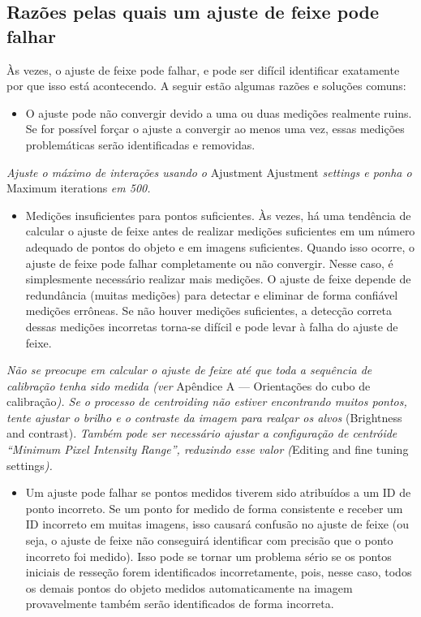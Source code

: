 \documentclass[
  12pt,
  letterpaper,
  DIV=11,
  numbers=noendperiod]{scrreprt}
\providecommand{\tightlist}{%
  \setlength{\itemsep}{0pt}\setlength{\parskip}{0pt}}
\begin{document}
\subsection{Razões pelas quais um ajuste de feixe pode
falhar}\label{razuxf5es-pelas-quais-um-ajuste-de-feixe-pode-falhar-1}

Às vezes, o ajuste de feixe pode falhar, e pode ser difícil identificar
exatamente por que isso está acontecendo. A seguir estão algumas razões
e soluções comuns:

\begin{itemize}
\tightlist
\item
  O ajuste pode não convergir devido a uma ou duas medições realmente
  ruins. Se for possível forçar o ajuste a convergir ao menos uma vez,
  essas medições problemáticas serão identificadas e removidas.
\end{itemize}

\emph{Ajuste o máximo de interações usando o} Ajustment \textbar{}
Ajustment \emph{settings e ponha o} Maximum iterations \emph{em 500.}

\begin{itemize}
\tightlist
\item
  Medições insuficientes para pontos suficientes. Às vezes, há uma
  tendência de calcular o ajuste de feixe antes de realizar medições
  suficientes em um número adequado de pontos do objeto e em imagens
  suficientes. Quando isso ocorre, o ajuste de feixe pode falhar
  completamente ou não convergir. Nesse caso, é simplesmente necessário
  realizar mais medições. O ajuste de feixe depende de redundância
  (muitas medições) para detectar e eliminar de forma confiável medições
  errôneas. Se não houver medições suficientes, a detecção correta
  dessas medições incorretas torna-se difícil e pode levar à falha do
  ajuste de feixe.
\end{itemize}

\emph{Não se preocupe em calcular o ajuste de feixe até que toda a
sequência de calibração tenha sido medida (ver} Apêndice A ---
Orientações do cubo de calibração\emph{). Se o processo de centroiding
não estiver encontrando muitos pontos, tente ajustar o brilho e o
contraste da imagem para realçar os alvos} (Brightness and contrast).
\emph{Também pode ser necessário ajustar a configuração de centróide
``Minimum Pixel Intensity Range'', reduzindo esse valor (}Editing and
fine tuning settings\emph{).}

\begin{itemize}
\tightlist
\item
  Um ajuste pode falhar se pontos medidos tiverem sido atribuídos a um
  ID de ponto incorreto. Se um ponto for medido de forma consistente e
  receber um ID incorreto em muitas imagens, isso causará confusão no
  ajuste de feixe (ou seja, o ajuste de feixe não conseguirá identificar
  com precisão que o ponto incorreto foi medido). Isso pode se tornar um
  problema sério se os pontos iniciais de resseção forem identificados
  incorretamente, pois, nesse caso, todos os demais pontos do objeto
  medidos automaticamente na imagem provavelmente também serão
  identificados de forma incorreta.
\end{itemize}
\end{document}

